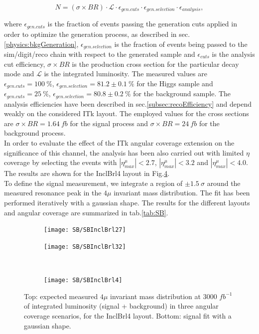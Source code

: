 \documentclass[a4paper,twoside,12pt]{article}
\begin{document}
\begin{equation*}
N = (\sigma \times BR)\cdot \mathcal{L}\cdot \epsilon_{gen. cuts}\cdot \epsilon_{gen. selection} \cdot \epsilon_{analysis},
\end{equation*}

where $\epsilon_{gen. cuts}$ is the fraction of events passing the generation cuts applied in order to optimize the generation process, as described in sec.\ref{physics:bkgGeneration}, 
$\epsilon_{gen. selection}$ is the fraction of events being passed to the sim/digit/reco chain with respect to the generated sample and $\epsilon_{cuts}$ is the 
analysis cut efficiency, $\sigma \times BR$ is the production cross section for the particular decay mode and $\mathcal{L}$ is the integrated luminosity. The measured values are $\epsilon_{gen. cuts} = 100\ \%$, $\epsilon_{gen. selection} = 81.2 \pm 0.1\ \%$ for the Higgs sample and 
$\epsilon_{gen. cuts} = 25\ \%$, $\epsilon_{gen. selection} = 80.8 \pm 0.2\ \%$ for
the background sample. The analysis efficiencies have been described in sec.\ref{subsec:recoEfficiency} and depend weakly on the considered ITk layout. The employed values for the cross sections are
$\sigma \times BR = 1.64\ fb$ for the signal process and $\sigma \times BR = 24\ fb$ for the background process.\\

In order to evaluate the effect of the ITk angular coverage extension on the significance of this channel, the analysis has been also carried out with limited $\eta$ coverage by selecting 
the events with $|\eta^\mu_{max}| < 2.7$, $|\eta^\mu_{max}| < 3.2$ and $|\eta^\mu_{max}| < 4.0$. The results are shown for the InclBrl4 layout in Fig.\ref{fig:SB}.\\

To define the signal measurement, we integrate a region of $\pm 1.5\ \sigma$ around the measured resonance peak in the $4\mu$ invariant mass distribution. The fit has been performed iteratively 
with a gaussian shape. The results for the different layouts and angular coverage are summarized in tab.\ref{tab:SB}.

\begin{figure}
\begin{subfigure}{.5\linewidth}
\texttt{[image: SB/SBInclBrl27]}
\caption{}
\label{fig:SBInclBrl27}
\end{subfigure}
\begin{subfigure}{.5\linewidth}
\centering
\texttt{[image: SB/SBInclBrl32]}
\caption{}
\label{fig:SBInclBrl32}
\end{subfigure}\\[1ex]
\begin{subfigure}{\linewidth}
\centering
\texttt{[image: SB/SBInclBrl4]}
\caption{}
\label{fig:SBInclBrl4}
\end{subfigure}
\caption{Top: expected measured $4\mu$ invariant mass distribution at 3000 $fb^{-1}$ of integrated luminosity (signal + background) in
	three angular coverage scenarios, for the InclBrl4 layout. Bottom: signal fit with a gaussian shape.	 }
\label{fig:SB}
\end{figure}
\end{document}
